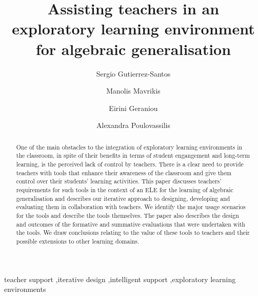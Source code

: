 \documentclass[authoryear,preprint,12pt]{elsarticle}
\begin{document}
\begin{frontmatter}



\title{Assisting teachers in an exploratory learning environment
  for algebraic generalisation} 


\author[BBK]{Sergio Gutierrez-Santos}
\author[IoE]{Manolis Mavrikis}
\author[IoE]{Eirini Geraniou}
\author[BBK]{Alexandra Poulovassilis}

\address[BBK]{London Knowledge Lab, Birkbeck}
\address[IoE]{London Knowledge Lab, Institute of Education}

\begin{abstract}
One of the main obstacles to the integration of exploratory learning
environments in the classroom, in spite of their benefits in terms of
student engangement and long-term learning, is the perceived lack of
control by teachers. There is a clear need to provide teachers with
tools that enhance their awareness of the classroom and give them
control over their students' learning activities. 
%
This paper discusses
teachers’ requirements for such tools in the context of an ELE for the
learning of algebraic generalisation and describes our iterative
approach to designing, developing and evaluating them in collaboration
with teachers. We identify the major usage scenarios for the tools and
describe the tools themselves. 
%
The paper also describes the design and outcomes of the formative and
summative evaluations that were undertaken with the tools. We draw
conclusions relating to the value of these tools to teachers and their
possible extensions to other learning domains.
\end{abstract}

\begin{keyword}
     teacher support 
\sep iterative design 
\sep intelligent support 
\sep exploratory learning environments
\end{keyword}

\end{frontmatter}
\end{document}
